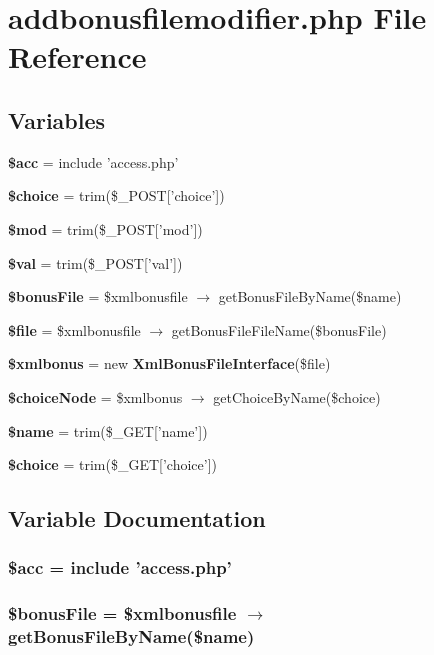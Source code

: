 \section{addbonusfilemodifier.php File Reference}
\label{addbonusfilemodifier_8php}


\subsection*{Variables}
\begin{CompactItemize}
\item 
{\bf \$acc} = include 'access.php'
\item 
{\bf \$choice} = trim(\$\_\-POST['choice'])
\item 
{\bf \$mod} = trim(\$\_\-POST['mod'])
\item 
{\bf \$val} = trim(\$\_\-POST['val'])
\item 
{\bf \$bonus\-File} = \$xmlbonusfile $\rightarrow$ get\-Bonus\-File\-By\-Name(\$name)
\item 
{\bf \$file} = \$xmlbonusfile $\rightarrow$ get\-Bonus\-File\-File\-Name(\$bonus\-File)
\item 
{\bf \$xmlbonus} = new {\bf Xml\-Bonus\-File\-Interface}(\$file)
\item 
{\bf \$choice\-Node} = \$xmlbonus $\rightarrow$ get\-Choice\-By\-Name(\$choice)
\item 
{\bf \$name} = trim(\$\_\-GET['name'])
\item 
{\bf \$choice} = trim(\$\_\-GET['choice'])
\end{CompactItemize}


\subsection{Variable Documentation}
\subsubsection{\setlength{\rightskip}{0pt plus 5cm}\$acc = include 'access.php'}\label{addbonusfilemodifier_8php_542926c588a05eb69553d79c83cf73da}


\subsubsection{\setlength{\rightskip}{0pt plus 5cm}\$bonus\-File = \$xmlbonusfile $\rightarrow$ get\-Bonus\-File\-By\-Name(\$name)}\label{addbonusfilemodifier_8php_6031931b24e474b9c8829866a2fdc6f6}


